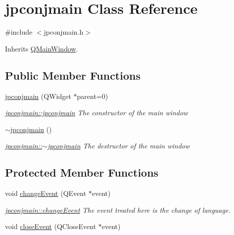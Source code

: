 \hypertarget{classjpconjmain}{}\section{jpconjmain Class Reference}
\label{classjpconjmain}


{\ttfamily \#include $<$jpconjmain.\+h$>$}



Inherits \hyperlink{class_q_main_window}{Q\+Main\+Window}.

\subsection*{Public Member Functions}
\begin{DoxyCompactItemize}
\item 
\hyperlink{classjpconjmain_a37b7bf9565ef998a6ec4f69e4406fa05}{jpconjmain} (Q\+Widget $\ast$parent=0)
\begin{DoxyCompactList}\small\item\em \hyperlink{classjpconjmain_a37b7bf9565ef998a6ec4f69e4406fa05}{jpconjmain\+::jpconjmain} The constructor of the main window \end{DoxyCompactList}\item 
\hyperlink{classjpconjmain_aaa28df088250723ce786eec06acab032}{$\sim$jpconjmain} ()
\begin{DoxyCompactList}\small\item\em \hyperlink{classjpconjmain_aaa28df088250723ce786eec06acab032}{jpconjmain\+::$\sim$jpconjmain} The destructor of the main window \end{DoxyCompactList}\end{DoxyCompactItemize}
\subsection*{Protected Member Functions}
\begin{DoxyCompactItemize}
\item 
void \hyperlink{classjpconjmain_ac945b702dbb1f7fffe21548ba6d58ebd}{change\+Event} (Q\+Event $\ast$event)
\begin{DoxyCompactList}\small\item\em \hyperlink{classjpconjmain_ac945b702dbb1f7fffe21548ba6d58ebd}{jpconjmain\+::change\+Event} The event treated here is the change of language. \end{DoxyCompactList}\item 
void \hyperlink{classjpconjmain_a5f38f24f1bedcb0c7fcffbd6a698897b}{close\+Event} (Q\+Close\+Event $\ast$event)
\end{DoxyCompactItemize}


